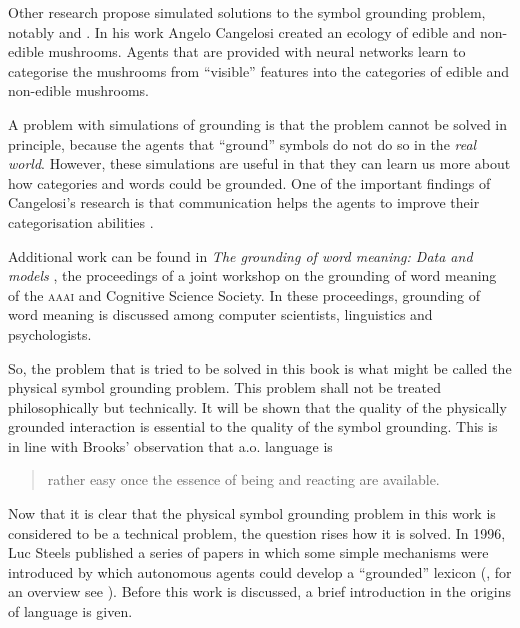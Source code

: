 Other research propose simulated solutions to the symbol grounding problem, notably \citet{cangelosiparisi:1998} and \citet{cangelosi:1998}. In his work Angelo Cangelosi created an ecology of edible and non-edible mushrooms. Agents that are provided with neural networks learn to categorise the mushrooms from ``visible'' features into the categories of edible and non-edible mushrooms.

A problem with simulations of grounding is that the problem cannot be solved in principle, because the agents that ``ground'' symbols do not do so in the {\em real world}. However, these simulations are useful in that they can learn us more about how categories and words could be grounded.  One of the important findings of Cangelosi's research is that communication helps the agents to improve their categorisation abilities \citep{cangelosiharnad:2000}.

Additional work can be found in {\em The grounding of word meaning: Data and models} \citep{gasser:1998}, the proceedings of a joint workshop on the grounding of word meaning of the \textsc{aaai} and Cognitive Science Society. In these proceedings, grounding of word meaning is discussed among computer scientists, linguistics and psychologists. 


So, the problem that is tried to be solved in this book is what might be called the physical symbol grounding problem. This problem shall not be treated philosophically but technically. It will be shown that the quality of the physically grounded interaction is essential to the quality of the symbol grounding. This is in line with Brooks' observation that a.o. language is 

\begin{quote}
rather easy once the essence of being and reacting are available.\newline\citep{brooks:1990}
\end{quote}

Now that it is clear that the physical symbol grounding problem in this work is considered to be a technical problem, the question rises how it is solved. In 1996, Luc Steels published a series of papers in which some simple mechanisms were introduced by which autonomous agents could develop a ``grounded'' lexicon (\citealt{steels:1996a,steels:1996b,steels:1996d,steels:1996e}, for an overview see \citealt{steels:1997b}). Before this work is discussed, a brief introduction in the origins of language is given.

